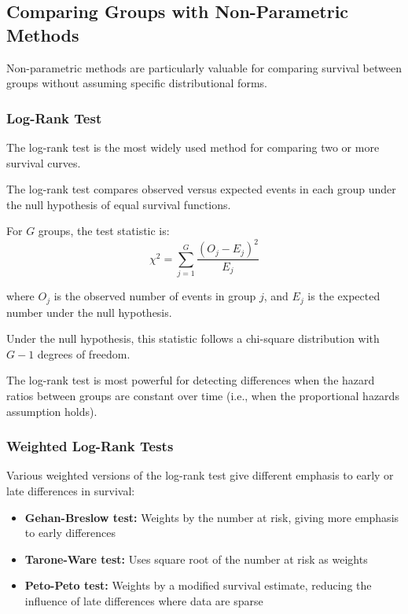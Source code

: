 \subsection{Comparing Groups with Non-Parametric Methods}

Non-parametric methods are particularly valuable for comparing survival between groups without assuming specific distributional forms.

\subsubsection{Log-Rank Test}

The log-rank test is the most widely used method for comparing two or more survival curves.

\begin{definitionbox}[title=Log-Rank Test]
The log-rank test compares observed versus expected events in each group under the null hypothesis of equal survival functions.

For $G$ groups, the test statistic is:
\begin{equation}
    \chi^2 = \sum_{j=1}^{G} \frac{(O_j - E_j)^2}{E_j}
\end{equation}

where $O_j$ is the observed number of events in group $j$, and $E_j$ is the expected number under the null hypothesis.

Under the null hypothesis, this statistic follows a chi-square distribution with $G-1$ degrees of freedom.
\end{definitionbox}

The log-rank test is most powerful for detecting differences when the hazard ratios between groups are constant over time (i.e., when the proportional hazards assumption holds).

\subsubsection{Weighted Log-Rank Tests}

Various weighted versions of the log-rank test give different emphasis to early or late differences in survival:
\begin{itemize}
    \item \textbf{Gehan-Breslow test:} Weights by the number at risk, giving more emphasis to early differences
    \item \textbf{Tarone-Ware test:} Uses square root of the number at risk as weights
    \item \textbf{Peto-Peto test:} Weights by a modified survival estimate, reducing the influence of late differences where data are sparse
\end{itemize}

